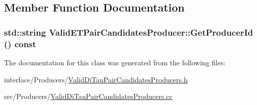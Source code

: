 \subsection{Member Function Documentation}
\hypertarget{classValidETPairCandidatesProducer_ac1a930e7ae92e41bb839368dd93e4af3}{
\subsubsection[{GetProducerId}]{\setlength{\rightskip}{0pt plus 5cm}std::string ValidETPairCandidatesProducer::GetProducerId () const}}
\label{classValidETPairCandidatesProducer_ac1a930e7ae92e41bb839368dd93e4af3}


The documentation for this class was generated from the following files:\begin{DoxyCompactItemize}
\item 
interface/Producers/\hyperlink{ValidDiTauPairCandidatesProducers_8h}{ValidDiTauPairCandidatesProducers.h}\item 
src/Producers/\hyperlink{ValidDiTauPairCandidatesProducers_8cc}{ValidDiTauPairCandidatesProducers.cc}\end{DoxyCompactItemize}
